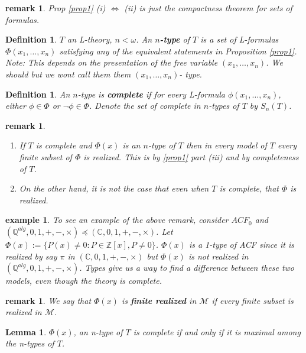 \documentclass[letterpaper, 12pt]{article}
\newcommand{\fin}{\qquad \quad \hfill \framebox[1.75mm][l]{\,}}
\newcommand{\cM}{\mathcal{M}}
\newcommand{\bZ}{\mathbb{Z}}
\newcommand{\bQ}{\mathbb{Q}}
\newcommand{\bC} {\mathbb{C}}
\theoremstyle{stdthm}
\newtheorem{lem}[thm]{Lemma}
\theoremstyle{stddef}
\newtheorem{defn}[thm]{Definition}
\newtheorem{rem}[thm]{remark} %
\newtheorem{eg}[thm]{example} %
\theoremstyle{stdnonum}
\theoremstyle{stdqands}
\theoremstyle{stdbold}
\begin{document}
\begin{rem}
Prop \ref{prop1} (i) $\Leftrightarrow $ (ii) is just the compactness theorem for sets of formulas.
\end{rem}

\begin{defn}
$T$ an L-theory, $n < \omega$. An {\bf $n$-type} of $T$ is a set of L-formulas $\Phi(x_1,\dots, x_n)$ satisfying any of the equivalent statements in  Proposition \ref{prop1}. Note: This depends on the presentation of the free variable $(x_1,\dots, x_n)$. We should but we wont call them them $(x_1,\dots, x_n)$- type. 
\end{defn}

\begin{defn}
An $n$-type is {\bf complete} if for every L-formula $\phi(x_1,\dots, x_n)$, either $\phi \in \Phi$ or $\neg \phi \in \Phi$. Denote the set of complete in $n$-types of $T$ by $S_n(T)$. 
\end{defn}

\begin{rem}
\begin{enumerate}
\item If $T$ is complete and $\Phi(x)$ is an $n$-type of $T$ then in \emph{every} model of $T$ every finite subset of $\Phi$ is realized. This is by \ref{prop1} part (iii) and by completeness of $T$. 
\item On the other hand, it is not the case that even when $T$ is complete, that $\Phi$ is realized. 
\end{enumerate}

\end{rem}

\begin{eg}
To see an example of the above remark, consider $ACF_0$ and $(\bQ^{alg}, 0,1,+,-,\times) \preceq (\bC, 0,1,+,-,\times)$. Let $\Phi(x) := \{P(x) \neq 0: P \in \bZ[x], P \neq 0\}$. $\Phi(x)$ is a 1-type of ACF since it is realized by say $\pi$ in $(\bC, 0, 1, +,-,\times)$ but $\Phi(x)$ is not realized in $(\bQ^{alg}, 0, 1,+,-,\times)$. Types give us a way to find a difference between these two models, even though the theory is complete. 
\end{eg}

\begin{rem}
We say that $\Phi(x)$ is {\bf finite realized} in $\cM$ if every finite subset is realized in $\cM$. 
\end{rem}

\begin{lem}
$\Phi(x)$, an n-type of $T$ is complete if and only if it is maximal among the n-types of $T$. 
\end{lem}
\end{document}
